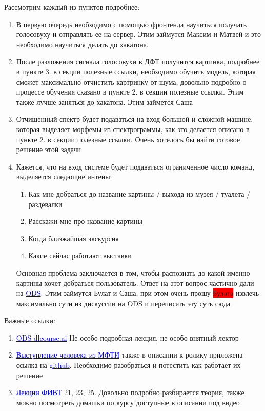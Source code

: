 \documentclass[11pt]{article}
\begin{document}
Рассмотрим каждый из пунктов подробнее:
\begin{enumerate}
\item В первую очередь необходимо с помощью фронтенда научиться получать голосовуху и отправлять ее на сервер. Этим займутся Максим и Матвей и это необходимо научиться делать до хакатона.
\item После разложения сигнала голосовухи в ДФТ получится картинка, подробнее в пункте 3. в секции полезные ссылки, необходимо обучить модель, которая сможет максимально отчистить картринку от шума, довольно подробно о процессе обучения сказано в пункте 2. в секции полезные ссылки. Этим также лучше заняться до хакатона. Этим займется Саша
\item Отчищенный спектр будет подаваться на вход большой и сложной машине, которая выделяет морфемы из спектрограммы, как это делается описано в пункте 2. в секции полезные ссылки. Очень хотелось бы найти готовое решение этой задачи
\item Кажется, что на вход системе будет подаваться ограниченное число команд, выделяется следющие интены:\begin{enumerate}
\item Как мне добраться до название картины / выхода из музея / туалета / раздевалки
\item Расскажи мне про название картины
\item Когда близжайшая экскурсия
\item Какие сейчас работают выставки 
\end{enumerate}

Основная проблема заключается в том, чтобы распознать до какой именно картины хочет добраться пользователь. Ответ на этот вопрос частично дали на \href{https://opendatascience.slack.com/archives/C04N3UMSL/p1568308189002800}{\textcolor{blue}{ODS}}. Этим займутся Булат и Саша, при этом очень прошу \colorbox{red}{Булата} извлечь максимально сути из дискуссии на ODS и переписать эту суть сюда


\end{enumerate}

Важные ссылки:
\begin{enumerate}
\item \href{https://www.youtube.com/watch?v=JpS0LzEWr-4}{\textcolor{blue}{ODS dlcourse.ai}} Не особо подробная лекция, не особо внятный лектор 
\item \href{https://www.youtube.com/watch?v=eke2h9fGtu0}{\textcolor{blue}{Выступление человека из МФТИ}} также в описании к ролику приложена ссылка на \href{https://github.com/nsu-ai-team/voxforge_ru_sphinx_experiments}{\textcolor{blue}{github}}. Необходимо разобраться и потестить как работает их решение
\item \href{https://www.youtube.com/playlist?list=PL0Ks75aof3ThkitsZbUOEQg7Ybl5kB_s3}{\textcolor{blue}{Лекции ФИВТ}} 21, 23, 25. Довольно подробно разбирается теория, также можно посмотреть домашки по курсу доступные в описании под видео

\end{enumerate}
\end{document}
